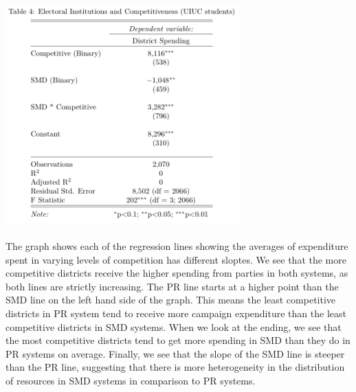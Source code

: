 \documentclass{article}
\begin{document}
\includegraphics[width=90mm]{Regressions_UIUC}\\
\fi
\\
The graph shows each of the regression lines showing the averages of expenditure spent in varying levels of competition has different sloptes. We see that the more competitive districts receive the higher spending from parties in both systems, as  both lines are strictly increasing. The PR line starts at a higher point than the SMD line on the left hand side of the graph. This means the least competitive districts in PR system tend to receive more campaign expenditure than the least competitive districts in SMD systems. When we look at the ending, we see that the most competitive districts tend to get more spending in SMD than they do in PR systems on average. Finally, we see that the slope of the SMD line is steeper than the PR line, suggesting that there is more heterogeneity in the distribution of resources in SMD systems in comparison to PR systems. 
\end{document}
